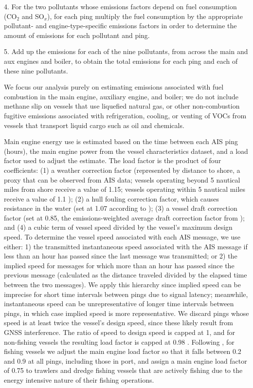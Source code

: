 \documentclass[lineno,pdflatex,sn-nature]{sn-jnl}
\begin{document}
4. For the two pollutants whose emissions factors depend on fuel consumption (CO$_{2}$ and SO$_{x}$), for each ping multiply the fuel consumption by the appropriate pollutant- and engine-type-specific emissions factors in order to determine the amount of emissions for each pollutant and ping.

5. Add up the emissions for each of the nine pollutants, from across the main and aux engines and boiler, to obtain the total emissions for each ping and each of these nine pollutants. 

We focus our analysis purely on estimating emissions associated with fuel combustion in the main engine, auxiliary engine, and boiler; we do not include  methane slip on vessels that use liquefied natural gas, or other non-combustion fugitive emissions associated with refrigeration, cooling, or venting of VOCs from vessels that transport liquid cargo such as oil and chemicals.

Main engine energy use is estimated based on the time between each AIS ping (hours), the main engine power from the vessel characteristics dataset, and a load factor used to adjust the estimate. The load factor is the product of four coefficients: (1) a weather correction factor (represented by distance to shore, a proxy that can be observed from AIS data; vessels operating beyond 5 nautical miles from shore receive a value of 1.15; vessels operating within 5 nautical miles receive a value of 1.1 \cite{olmer2017greenhouse, fourth2020greenhouse}); (2) a hull fouling correction factor, which causes resistance in the water (set at 1.07 according to \cite{olmer2017greenhouse}); (3) a vessel draft correction factor (set at 0.85, the emissions-weighted average draft correction factor from \cite{olmer2017greenhouse, fourth2020greenhouse}); and (4) a cubic term of vessel speed divided by  the vessel's maximum design speed. To determine the vessel speed associated with each AIS message, we use either: 1) the transmitted instantaneous speed associated with the AIS message if less than an hour has passed since the last message was transmitted; or 2) the implied speed for messages for which more than an hour has passed since the previous message (calculated as the distance traveled divided by the elapsed time between the two messages). We apply this hierarchy since implied speed can be imprecise for short time intervals between pings due to signal latency; meanwhile, instantaneous speed can be unrepresentative of longer time intervals between pings, in which case implied speed is more representative. We discard pings whose speed is at least twice the vessel's design speed, since these likely result from GNSS interference. The ratio of speed to design speed is capped at 1, and for non-fishing vessels the resulting load factor is capped at 0.98 \cite{olmer2017greenhouse, fourth2020greenhouse}. Following \cite{coello2015ais, sala2018economics}, for fishing vessels we adjust the main engine load factor so that it falls between 0.2 and 0.9 at all pings, including those in port, and assign a main engine load factor of 0.75 to trawlers and dredge fishing vessels that are actively fishing due to the energy intensive nature of their fishing operations. 
\end{document}
